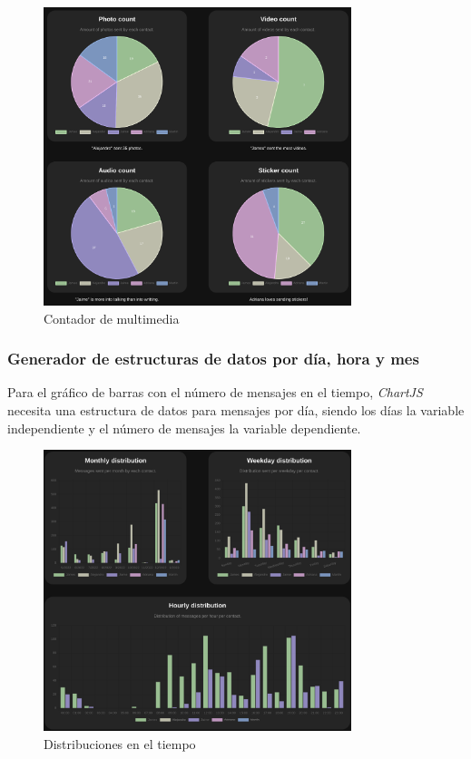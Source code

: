 \begin{figure}[H]
	\centering
	\includegraphics[width=0.8\textwidth]{img/media_count.png}
	\caption{Contador de multimedia}
	\label{fig:chap4:media_count}
\end{figure}


\subsubsection{Generador de estructuras de datos por día, hora y mes}

Para el gráfico de barras con el número de mensajes en el tiempo, \textit{ChartJS} necesita una estructura de datos para mensajes por día, siendo los días la variable independiente y el número de mensajes la variable dependiente.

\begin{figure}[h]
	\centering
	\includegraphics[width=0.8\textwidth]{img/time_distributions.png}
	\caption{Distribuciones en el tiempo}
	\label{fig:chap4:time_distributions}
\end{figure}

